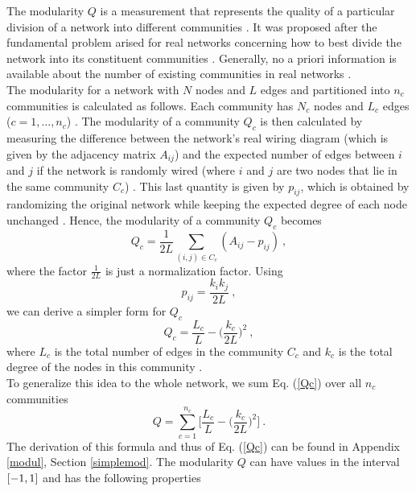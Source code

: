 \documentclass[11 pt , letterpaper , twoside , openright]{book}
\begin{document}
The modularity $Q$ is a measurement that represents the quality of a particular division of a network into different communities \cite{F.Costa2007}. It was proposed after the fundamental problem arised for real networks concerning how to best divide the network into its constituent communities \cite{F.Costa2007}. Generally, no a priori information is available about the number of existing communities in real networks \cite{F.Costa2007}.\\
The modularity for a network with $N$ nodes and $L$ edges and partitioned into $n_c$ communities is calculated as follows. Each community has $N_c$ nodes and $L_c$ edges ($c = 1,..., n_c$) \cite{Albert2016}. The modularity of a community $Q_c$ is then calculated by measuring the difference between the network's real wiring diagram (which is given by the adjacency matrix $A_{ij}$) and the expected number of edges between $i$ and $j$ if the network is randomly wired (where $i$ and $j$ are two nodes that lie in the same community $C_c$) \cite{Albert2016}. This last quantity is given by $p_{ij}$, which is obtained by randomizing the original network while keeping the expected degree of each node unchanged \cite{Albert2016}. Hence, the modularity of a community $Q_c$ becomes \cite{Albert2016}
\begin{equation}
	Q_c = \frac{1}{2L}\sum_{(i,j) \in C_c} (A_{ij} - p_{ij}) \ ,
\end{equation}
where the factor $\frac{1}{2L}$ is just a normalization factor. Using \cite{Albert2016}
\begin{equation}
	p_{ij} = \frac{k_ik_j}{2L} \ ,
\end{equation}
we can derive a simpler form for $Q_c$ \cite{Albert2016}
\begin{equation}\label{Qc}
	Q_c = \frac{L_c}{L} - \bigg(\frac{k_c}{2L}\bigg)^2 \ ,
\end{equation}
where $L_c$ is the total number of edges in the community $C_c$ and $k_c$ is the total degree of the nodes in this community \cite{Albert2016}.\\
To generalize this idea to the whole network, we sum Eq. (\ref{Qc}) over all $n_c$ communities \cite{Albert2016}
\begin{equation}\label{mod}
	Q = \sum_{c = 1}^{n_c}\bigg[\frac{L_c}{L} - \bigg(\frac{k_c}{2L}\bigg)^2 \bigg] \ .
\end{equation}
The derivation of this formula and thus of Eq. (\ref{Qc}) can be found in Appendix \ref{modul}, Section \ref{simplemod}. The modularity $Q$ can have values in the interval $\interval{-1}{1}$ and has the following properties \cite{Albert2016}
\end{document}
